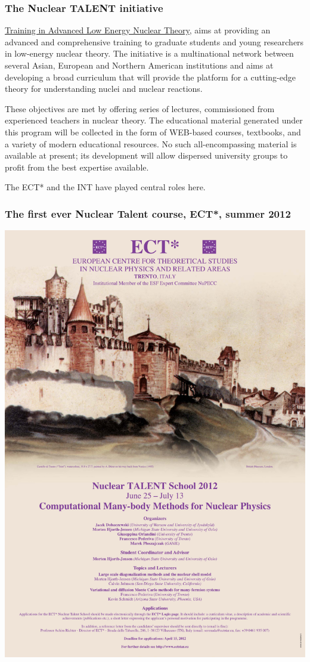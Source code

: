 \documentclass{beamer}
\begin{document}
\begin{frame}
\frametitle{The Nuclear TALENT initiative}

\href{{https://fribtheoryalliance.org/TALENT/}}{Training in Advanced Low Energy Nuclear Theory},  
aims at providing an advanced and comprehensive training to graduate students
and young researchers in low-energy nuclear theory. The initiative
is a multinational network between several Asian, European and Northern
American institutions and aims at developing a broad curriculum that
will provide the platform for a cutting-edge theory for understanding
nuclei and nuclear reactions.

These objectives are met by
offering series of lectures, commissioned from experienced teachers
in nuclear theory. The educational material generated under this
program will be collected in the form of WEB-based courses,
textbooks, and a variety of modern educational resources. No such
all-encompassing material is available at present; its development
will allow dispersed university groups to profit from the best
expertise available.

The ECT* and the INT have played central roles here.
\end{frame}

\begin{frame}
\frametitle{The first ever Nuclear Talent course, ECT*, summer 2012}

\vspace{6mm}

\centerline{\includegraphics[width=0.6\linewidth]{Photos/talent2012.pdf}}

\vspace{6mm}
\end{frame}
\end{document}
